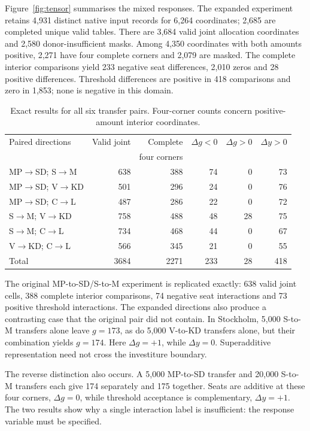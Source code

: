 \documentclass[11pt,a4paper]{article}
\begin{document}
Figure~\ref{fig:tensor} summarises the mixed responses. The expanded experiment retains 4,931 distinct native input records for 6,264 coordinates; 2,685 are completed unique valid tables. There are 3,684 valid joint allocation coordinates and 2,580 donor-insufficient masks. Among 4,350 coordinates with both amounts positive, 2,271 have four complete corners and 2,079 are masked. The complete interior comparisons yield 233 negative seat differences, 2,010 zeros and 28 positive differences. Threshold differences are positive in 418 comparisons and zero in 1,853; none is negative in this domain.

\begin{table}[tbp]\centering\small
\caption{Exact results for all six transfer pairs. Four-corner counts concern positive-amount interior coordinates.}\label{tab:pairs}
\begin{tabularx}{\linewidth}{Xrrrrr}\toprule
Paired directions&Valid joint&Complete&\(\Delta g<0\)&\(\Delta g>0\)&\(\Delta y>0\)\\
&&four corners&&&\\\midrule
MP\(\to\)SD; S\(\to\)M&638&388&74&0&73\\
MP\(\to\)SD; V\(\to\)KD&501&296&24&0&76\\
MP\(\to\)SD; C\(\to\)L&487&286&22&0&72\\
S\(\to\)M; V\(\to\)KD&758&488&48&28&75\\
S\(\to\)M; C\(\to\)L&734&468&44&0&67\\
V\(\to\)KD; C\(\to\)L&566&345&21&0&55\\\midrule
Total&3684&2271&233&28&418\\\bottomrule
\end{tabularx}
\end{table}

The original MP-to-SD/S-to-M experiment is replicated exactly: 638 valid joint cells, 388 complete interior comparisons, 74 negative seat interactions and 73 positive threshold interactions. The expanded directions also produce a contrasting case that the original pair did not contain. In Stockholm, 5,000 S-to-M transfers alone leave \(g=173\), as do 5,000 V-to-KD transfers alone, but their combination yields \(g=174\). Here \(\Delta g=+1\), while \(\Delta y=0\). Superadditive representation need not cross the investiture boundary.

The reverse distinction also occurs. A 5,000 MP-to-SD transfer and 20,000 S-to-M transfers each give 174 separately and 175 together. Seats are additive at these four corners, \(\Delta g=0\), while threshold acceptance is complementary, \(\Delta y=+1\). The two results show why a single interaction label is insufficient: the response variable must be specified.
\end{document}
